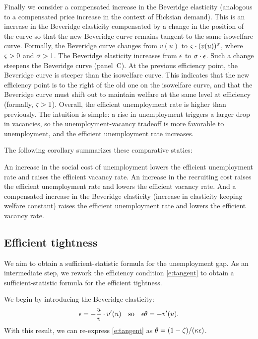 \documentclass[letterpaper,12pt,leqno]{article}
\begin{document}
Finally we consider a compensated increase in the Beveridge elasticity (analogous to a compensated price increase in the context of Hicksian demand). This is an increase in the Beveridge elasticity compensated by a change in the position of the curve so that the new Beveridge curve remains tangent to the same isowelfare curve. Formally, the Beveridge curve changes from $v(u)$ to $\varsigma \cdot (v(u))^\sigma$, where $\varsigma >0$ and $\sigma>1$. The Beveridge elasticity increases from $\epsilon$ to $\sigma \cdot \epsilon$. Such a change steepens the Beveridge curve (panel~C). At the previous efficiency point, the Beveridge curve is steeper than the isowelfare curve. This indicates that the new efficiency point is to the right of the old one on the isowelfare curve, and that the Beveridge curve must shift out to maintain welfare at the same level at efficiency (formally, $\varsigma>1$). Overall, the efficient unemployment rate is higher than previously. The intuition is simple: a rise in unemployment triggers a larger drop in vacancies, so the unemployment-vacancy tradeoff is more favorable to unemployment, and the efficient unemployment rate increases. 

The following corollary summarizes these comparative statics:

\begin{corollary} An increase in the social cost of unemployment lowers the efficient unemployment rate and raises the efficient vacancy rate. An increase in the recruiting cost raises the efficient unemployment rate and lowers the efficient vacancy rate. And a compensated increase in the Beveridge elasticity (increase in elasticity keeping welfare constant) raises the efficient unemployment rate and lowers the efficient vacancy rate.\end{corollary}

\subsection{Efficient tightness}

We aim to obtain a sufficient-statistic formula for the unemployment gap. As an intermediate step, we rework the efficiency condition \eqref{e:tangent} to obtain a sufficient-statistic formula for the efficient tightness.

We begin by introducing the Beveridge elasticity: 
\begin{equation*}
\epsilon = - \frac{u}{v} \cdot v'(u)\quad\text{so}\quad \epsilon\theta = - v'(u). 
\end{equation*}
With this result, we can re-express \eqref{e:tangent} as $\theta = (1-\zeta)/(\kappa\epsilon)$. 
\end{document}
